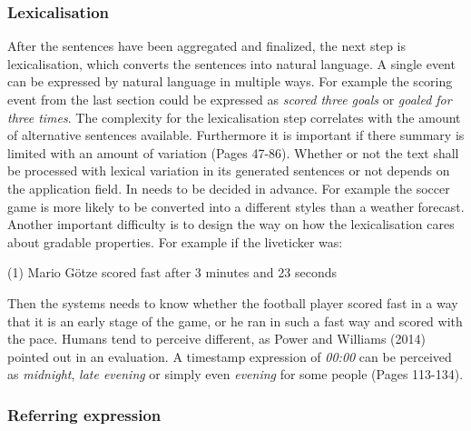 \subsubsection{Lexicalisation}

After the sentences have been aggregated and finalized, the next step is lexicalisation, which converts the sentences into natural language. A single event can be expressed by natural language in multiple ways. For example the scoring event from the last section could be expressed as \textit{scored three goals} or \textit{goaled for three times}. The complexity for the lexicalisation step correlates with the amount of alternative sentences available. Furthermore it is important if there summary is limited with an amount of variation \cite{Theune} (Pages 47-86). Whether or not the text shall be processed with lexical variation in its generated sentences or not depends on the application field. In needs to be decided in advance. For example the soccer game is more likely to be converted into a different styles than a weather forecast. Another important difficulty is to design the way on how the lexicalisation cares about gradable properties. For example if the liveticker was:

\begin{tcolorbox}
	\begin{center}
		(1) Mario Götze scored fast after 3 minutes and 23 seconds
	\end{center}
\end{tcolorbox}

Then the systems needs to know whether the football player scored fast in a way that it is an early stage of the game, or he ran in such a fast way and scored with the pace. Humans tend to perceive different, as Power and Williams (2014) pointed out in an evaluation. A timestamp expression of \textit{00:00} can be perceived as \textit{midnight}, \textit{late evening} or simply even \textit{evening} for some people \cite{Power} (Pages 113-134).


\subsubsection{Referring expression}

